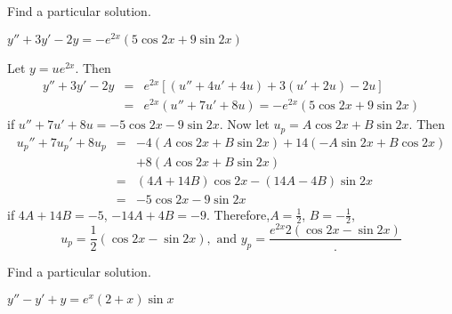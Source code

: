 \documentclass{ximera}
\begin{document}
\begin{problem}\label{exer:5.5.4} Find a particular solution. 

$y''+3y'-2y=-e^{2x}(5\cos2x+9\sin2x)$

\begin{solution}
Let $y=ue^{2x}$. Then
\begin{eqnarray*}
y''+3y'-2y&=&e^{2x}\left[(u''+4u'+4u)+3(u'+2u)-2u\right]\\
&=&e^{2x}(u''+7u'+8u)=-e^{2x}(5\cos2x+9\sin2x)
\end{eqnarray*}
if $u''+7u'+8u=-5\cos2x-9\sin2x$. Now let $u_p=A\cos2x+B\sin2x$. Then
\begin{eqnarray*}
u_p''+7u_p'+8u_p&=&-4(A\cos2x+B\sin2x)+14(-A\sin2x+B\cos2x)\\&&
+8(A\cos2x+B\sin2x)\\ &=&
(4A+14B)\cos2x-(14A-4B)\sin2x\\ &=&-5\cos2x-9\sin2x
\end{eqnarray*}
if $4A+14B=-5$, $-14A+4B=-9$. Therefore,$A=\frac{1}{2}$,
$B=-\frac{1}{2}$,
$$
 u_p=\frac{1}{2}(\cos2x-\sin2x), \text{ and }
y_p=\frac{{e^{2x}}{2}(\cos2x-\sin2x)}.
$$
\end{solution}
\end{problem}

\begin{problem}\label{exer:5.5.5} Find a particular solution. 

$y''-y'+y=e^x(2+x)\sin x$
\end{problem}
\end{document}
